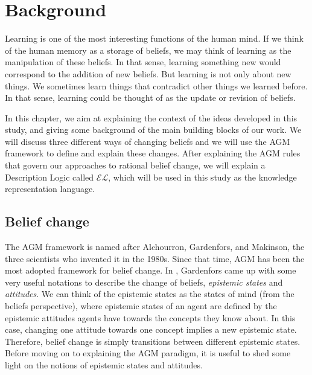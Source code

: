 \chapter{Background}
Learning is one of the most interesting functions of the human mind. If we think of the human memory as a storage of beliefs, we may think of learning as the manipulation of these beliefs. In that sense, learning something new would correspond to the addition of new beliefs. But learning is not only about new things. We sometimes learn things that contradict other things we learned before. In that sense, learning could be thought of as the update or revision of beliefs. 

In this chapter, we aim at explaining the context of the ideas developed in this study, and giving some background of the main building blocks of our work. We will discuss three different ways of changing beliefs and we will use the AGM framework\cite{kr} to define and explain these changes. After explaining the AGM rules that govern our approaches to rational belief change, we will explain a Description Logic called $\mathcal{EL}$, which will be used in this study as the knowledge representation language.

\section{Belief change}
The AGM framework is named after Alchourron, Gardenfors, and Makinson, the three scientists who invented it in the 1980s. Since that time, AGM has been the most adopted framework for belief change. In \cite{flux}, Gardenfors came up with some very useful notations to describe the change of beliefs, \textit{epistemic states} and \textit{attitudes}. We can think of the epistemic states as the states of mind (from the beliefs perspective), where epistemic states of an agent are defined by the epistemic attitudes agents have towards the concepts they know about. In this case, changing one attitude towards one concept implies a new epistemic state. Therefore, belief change is simply transitions between different epistemic states. Before moving on to explaining the AGM paradigm, it is useful to shed some light on the notions of epistemic states and attitudes.


